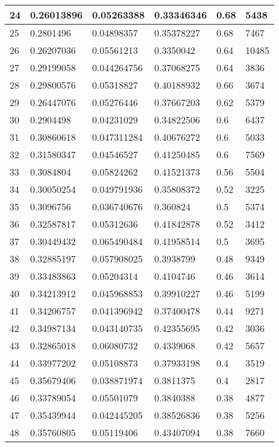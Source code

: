 \begin{longtable}{|l|l|l|l|l|l|}
24 & 0.26013896 & 0.05263388 & 0.33346346 & 0.68 & 5438 \\ \hline 
25 & 0.2801496 & 0.04898357 & 0.35378227 & 0.68 & 7467 \\ \hline 
26 & 0.26207036 & 0.05561213 & 0.3350042 & 0.64 & 10485 \\ \hline 
27 & 0.29199058 & 0.044264756 & 0.37068275 & 0.64 & 3836 \\ \hline 
28 & 0.29800576 & 0.05318827 & 0.40188932 & 0.66 & 3674 \\ \hline 
29 & 0.26447076 & 0.05276446 & 0.37667203 & 0.62 & 5379 \\ \hline 
30 & 0.2904498 & 0.04231029 & 0.34822506 & 0.6 & 6437 \\ \hline 
31 & 0.30860618 & 0.047311284 & 0.40676272 & 0.6 & 5033 \\ \hline 
32 & 0.31580347 & 0.04546527 & 0.41250485 & 0.6 & 7569 \\ \hline 
33 & 0.3084804 & 0.05824262 & 0.41521373 & 0.56 & 5504 \\ \hline 
34 & 0.30050254 & 0.049791936 & 0.35808372 & 0.52 & 3225 \\ \hline 
35 & 0.3096756 & 0.036740676 & 0.360824 & 0.5 & 5374 \\ \hline 
36 & 0.32587817 & 0.05312636 & 0.41842878 & 0.52 & 3412 \\ \hline 
37 & 0.30449432 & 0.065490484 & 0.41958514 & 0.5 & 3695 \\ \hline 
38 & 0.32885197 & 0.057908025 & 0.3938799 & 0.48 & 9349 \\ \hline 
39 & 0.33483863 & 0.05204314 & 0.4104746 & 0.46 & 3614 \\ \hline 
40 & 0.34213912 & 0.045968853 & 0.39910227 & 0.46 & 5199 \\ \hline 
41 & 0.34206757 & 0.041396942 & 0.37400478 & 0.44 & 9271 \\ \hline 
42 & 0.34987134 & 0.043140735 & 0.42355695 & 0.42 & 3036 \\ \hline 
43 & 0.32865018 & 0.06080732 & 0.4339068 & 0.42 & 5657 \\ \hline 
44 & 0.33977202 & 0.05108873 & 0.37933198 & 0.4 & 3519 \\ \hline 
45 & 0.35679406 & 0.038871974 & 0.3811375 & 0.4 & 2817 \\ \hline 
46 & 0.33789054 & 0.05501079 & 0.3840388 & 0.38 & 4877 \\ \hline 
47 & 0.35439944 & 0.042445205 & 0.38526836 & 0.38 & 5256 \\ \hline 
48 & 0.35760805 & 0.05119406 & 0.43407094 & 0.38 & 7660 \\ \hline 

\end{longtable}
